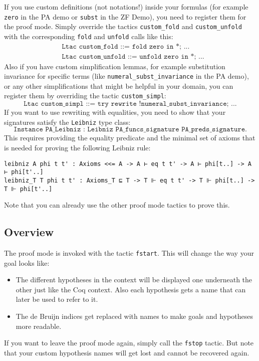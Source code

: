 \documentclass[12pt, a4paper]{article}
\newcommand{\coq}[1]{\texttt{#1}}
\begin{document}
\medskip\noindent
If you use custom definitions (not notations!) inside your formulas (for example \texttt{zero} in the PA demo or \texttt{subst} in the ZF Demo), you need to register them for the proof mode.
Simply override the tactics \texttt{custom\_fold} and \texttt{custom\_unfold} with the corresponding \texttt{fold} and \texttt{unfold} calls like this:
\begin{align*}
	& \coq{Ltac custom_fold ::= fold zero in *; ...} \\
	& \coq{Ltac custom_unfold ::= unfold zero in *; ...}
\end{align*}
Also if you have custom simplification lemmas, for example substitution invariance for specific terms (like \texttt{numeral\_subst\_invariance} in the PA demo), or any other simplifications that might be helpful in your domain, you can register them by overriding the tactic \texttt{custom\_simpl}:
$$\coq{Ltac custom_simpl ::= try rewrite !numeral_subst_invariance; ...}$$
If you want to use rewriting with equalities, you need to show that your signatures satisfy the \texttt{Leibniz} type class:
$$\coq{Instance PA_Leibniz : Leibniz PA_funcs_signature PA_preds_signature.}$$
This requires providing the equality predicate and the minimal set of axioms that is needed for proving the following Leibniz rule:

\begin{verbatim}
leibniz A phi t t' : Axioms <<= A -> A ⊢ eq t t' -> A ⊢ phi[t..] -> A ⊢ phi[t'..]
leibniz_T T phi t t' : Axioms_T ⊑ T -> T ⊩ eq t t' -> T ⊩ phi[t..] -> T ⊩ phi[t'..]
\end{verbatim}
Note that you can already use the other proof mode tactics to prove this.

\subsection{Overview}

The proof mode is invoked with the tactic \texttt{fstart}. This will change the way your goal looks like:
\begin{itemize}
	\item 
	The different hypotheses in the context will be displayed one underneath the other just like the Coq context.
	Also each hypothesis gets a name that can later be used to refer to it.
	
	\item 
	The de Bruijn indices get replaced with names to make goals and hypotheses more readable.
\end{itemize}
If you want to leave the proof mode again, simply call the \texttt{fstop} tactic.
But note that your custom hypothesis names will get lost and cannot be recovered again.
\end{document}
